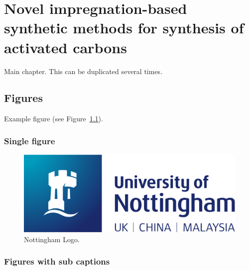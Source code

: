 \chapter{Novel impregnation-based synthetic methods for synthesis of activated carbons}
\label{ch:syntheses}

Main chapter. This can be duplicated several times.

\section{Figures}

Example figure (see Figure~\ref{fig:nottinghamlogo}).

\subsection{Single figure}
\begin{figure}[h]
    \centering
    \includegraphics[width=0.8\columnwidth]{images/nottingham-logo.png}
    \caption{Nottingham Logo.}
    \label{fig:nottinghamlogo}
\end{figure}

\subsection{Figures with sub captions}

